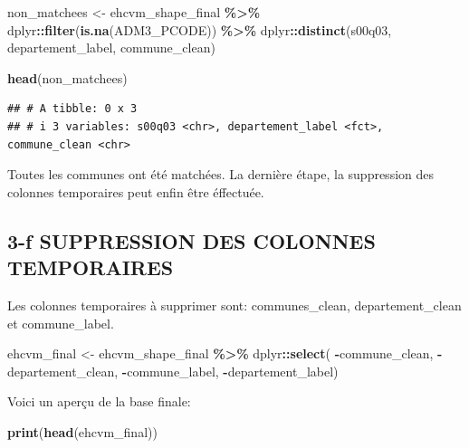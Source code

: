 \documentclass[
]{article}
\newenvironment{Shaded}{\begin{snugshade}}{\end{snugshade}}
\newcommand{\FunctionTok}[1]{\textcolor[rgb]{0.13,0.29,0.53}{\textbf{#1}}}
\newcommand{\NormalTok}[1]{#1}
\newcommand{\OtherTok}[1]{\textcolor[rgb]{0.56,0.35,0.01}{#1}}
\newcommand{\SpecialCharTok}[1]{\textcolor[rgb]{0.81,0.36,0.00}{\textbf{#1}}}
\begin{document}
\begin{Shaded}
\begin{Highlighting}[]
\NormalTok{non\_matchees }\OtherTok{\textless{}{-}}\NormalTok{ ehcvm\_shape\_final }\SpecialCharTok{\%\textgreater{}\%}
\NormalTok{  dplyr}\SpecialCharTok{::}\FunctionTok{filter}\NormalTok{(}\FunctionTok{is.na}\NormalTok{(ADM3\_PCODE)) }\SpecialCharTok{\%\textgreater{}\%}
\NormalTok{  dplyr}\SpecialCharTok{::}\FunctionTok{distinct}\NormalTok{(s00q03, departement\_label, commune\_clean)}

\FunctionTok{head}\NormalTok{(non\_matchees)}
\end{Highlighting}
\end{Shaded}

\begin{verbatim}
## # A tibble: 0 x 3
## # i 3 variables: s00q03 <chr>, departement_label <fct>, commune_clean <chr>
\end{verbatim}

Toutes les communes ont été matchées. La dernière étape, la suppression
des colonnes temporaires peut enfin être éffectuée.

\subsection{3-f SUPPRESSION DES COLONNES
TEMPORAIRES}\label{f-suppression-des-colonnes-temporaires}

Les colonnes temporaires à supprimer sont: communes\_clean,
departement\_clean et commune\_label.

\begin{Shaded}
\begin{Highlighting}[]
\NormalTok{ehcvm\_final }\OtherTok{\textless{}{-}}\NormalTok{ ehcvm\_shape\_final }\SpecialCharTok{\%\textgreater{}\%}
\NormalTok{  dplyr}\SpecialCharTok{::}\FunctionTok{select}\NormalTok{(}
    \SpecialCharTok{{-}}\NormalTok{commune\_clean, }\SpecialCharTok{{-}}\NormalTok{departement\_clean, }\SpecialCharTok{{-}}\NormalTok{commune\_label,}
    \SpecialCharTok{{-}}\NormalTok{departement\_label)}
\end{Highlighting}
\end{Shaded}

Voici un aperçu de la base finale:

\begin{Shaded}
\begin{Highlighting}[]
\FunctionTok{print}\NormalTok{(}\FunctionTok{head}\NormalTok{(ehcvm\_final))}
\end{Highlighting}
\end{Shaded}
\end{document}
